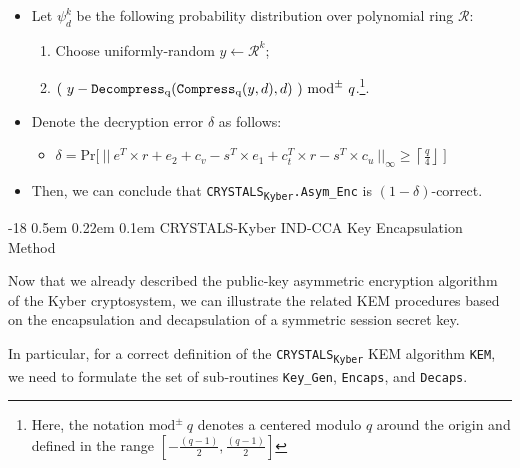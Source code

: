\documentclass[runningheads]{llncs}
\makeatletter
\renewcommand\subsubsection{\@startsection{subsubsection}{3}{\z@}%
                       {-18\p@ \@plus -4\p@ \@minus -4\p@}%
                       {0.5em \@plus 0.22em \@minus 0.1em}%
                       {\normalfont\normalsize\bfseries\boldmath}}
\numberwithin{equation}{section}
\makeatother
\begin{document}
    \begin{itemize}
        
        \item Let ${\psi}_{d}^{k}$ be the following probability distribution over polynomial ring $\mathcal{R}$:
        
        \begin{enumerate}
            \item Choose uniformly-random $y \gets {\mathcal{R}}^{k}$;
            \item \Return $(\ y - \mathrm{\texttt{Decompress}}\textsubscript{q}( \mathrm{\texttt{Compress}}\textsubscript{q}(y, d), d )\ )\ {\text{mod}}^{\pm}\ q$.\footnote{Here, the notation ${\text{mod}}^{\pm}\ q$ denotes a centered modulo $q$ around the origin and defined in the range $[-\frac{(q - 1)}{2}, \frac{(q - 1)}{2}]$}.
        \end{enumerate}

        \item Denote the decryption error $\delta$ as follows:
        \begin{itemize}
            \item $\delta = \mathrm{Pr}\Big[\ { \big|\big|\ {e}^{T} \times r + {e}_{2} + {c}_{v} - {s}^{T} \times {e}_{1} + {c}_{t}^{T} \times r - {s}^{T} \times {c}_{u}\ \big|\big| }_{\infty} \geq \left\lceil \frac{q}{4} \right\rfloor \ \Big]$
        \end{itemize}

        \item Then, we can conclude that \texorpdfstring{\texttt{CRYSTALS}\textsubscript{\texttt{Kyber}}\texttt{.Asym\_Enc}}\/ is $( 1 - \delta )$-correct.
        
    \end{itemize}

    \subsubsection{CRYSTALS-Kyber IND-CCA Key Encapsulation Method}
    \label{subsubsec:crystals-kyber-ind-cca-key-encapsulation-method}

    Now that we already described the public-key asymmetric encryption algorithm of the Kyber cryptosystem, we can illustrate the related KEM procedures based on the encapsulation and decapsulation of a symmetric session secret key.

    In particular, for a correct definition of the \texorpdfstring{\texttt{CRYSTALS}\textsubscript{\texttt{Kyber}}}\/ KEM algorithm \texttt{KEM}, we need to formulate the set of sub-routines \texttt{Key\_Gen}, \texttt{Encaps}, and \texttt{Decaps}.
\end{document}
